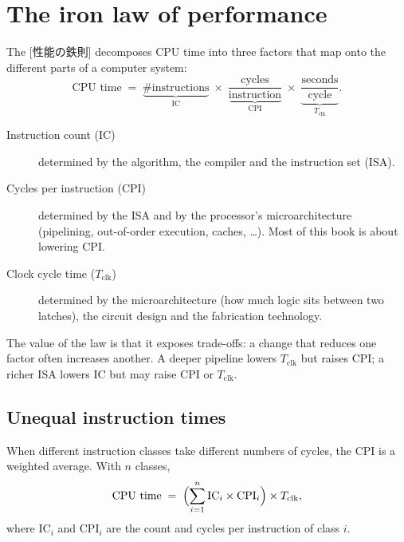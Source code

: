 \documentclass[../main.tex]{subfiles}
\begin{document}
\section{The iron law of performance}

The [性能の鉄則] decomposes CPU time into three factors
that map onto the different parts of a computer system:
\begin{equation}
  \text{CPU time}
  \;=\; \underbrace{\#\text{instructions}}_{\text{IC}}
  \;\times\; \underbrace{\frac{\text{cycles}}{\text{instruction}}}_{\text{CPI}}
  \;\times\; \underbrace{\frac{\text{seconds}}{\text{cycle}}}_{T_{\mathrm{clk}}} .
  \label{eq:iron-law}
\end{equation}

\begin{description}
  \item[Instruction count (IC)] determined by the algorithm, the compiler
    and the instruction set (ISA).
  \item[Cycles per instruction (CPI)] determined by the ISA and by the
    processor's microarchitecture (pipelining, out-of-order execution,
    caches, \ldots).  Most of this book is about lowering CPI.
  \item[Clock cycle time ($T_{\mathrm{clk}}$)] determined by the
    microarchitecture (how much logic sits between two
    latches), the circuit design
    and the fabrication technology.
\end{description}

The value of the law is that it exposes trade-offs: a change that reduces
one factor often increases another.  A deeper pipeline lowers
$T_{\mathrm{clk}}$ but raises CPI; a richer ISA lowers IC but may raise CPI
or $T_{\mathrm{clk}}$.

\subsection{Unequal instruction times}

When different instruction classes take different numbers of cycles, the
CPI is a weighted average.
With $n$ classes,
\begin{equation}
  \text{CPU time} \;=\; \Bigl(\sum_{i=1}^{n} \text{IC}_i \times \text{CPI}_i\Bigr)
  \times T_{\mathrm{clk}} ,
  \label{eq:iron-law-classes}
\end{equation}
where $\text{IC}_i$ and $\text{CPI}_i$ are the count and cycles per
instruction of class $i$.
\end{document}

